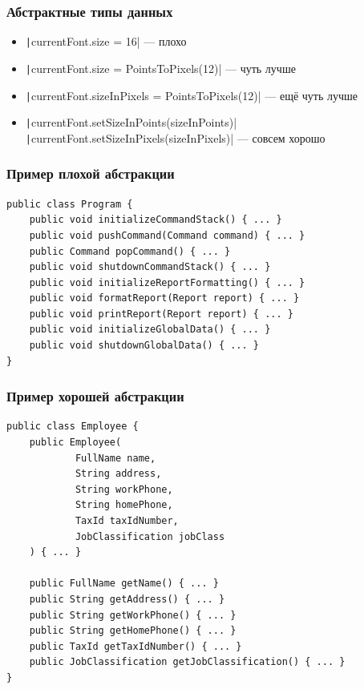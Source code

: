 \documentclass[xetex,mathserif,serif]{beamer}
\begin{document}
    \begin{frame}
        \frametitle{Абстрактные типы данных}
        \begin{itemize}
            \item \texttt|currentFont.size = 16| --- плохо
            \item \texttt|currentFont.size = PointsToPixels(12)| --- чуть лучше
            \item \texttt|currentFont.sizeInPixels = PointsToPixels(12)| --- ещё чуть лучше
            \item \texttt|currentFont.setSizeInPoints(sizeInPoints)| \newline
                    \texttt|currentFont.setSizeInPixels(sizeInPixels)| --- совсем хорошо
        \end{itemize}
    \end{frame}

    \begin{frame}[fragile]
        \frametitle{Пример плохой абстракции}
        \begin{verbatim}
public class Program {
    public void initializeCommandStack() { ... }
    public void pushCommand(Command command) { ... }
    public Command popCommand() { ... }
    public void shutdownCommandStack() { ... }
    public void initializeReportFormatting() { ... }
    public void formatReport(Report report) { ... }
    public void printReport(Report report) { ... }
    public void initializeGlobalData() { ... }
    public void shutdownGlobalData() { ... }
}
        \end{verbatim}
\end{frame}

    \begin{frame}[fragile]
        \frametitle{Пример хорошей абстракции}
        \begin{footnotesize}
            \begin{verbatim}
public class Employee {
    public Employee(
            FullName name,
            String address,
            String workPhone,
            String homePhone,
            TaxId taxIdNumber,
            JobClassification jobClass
    ) { ... }

    public FullName getName() { ... }
    public String getAddress() { ... }
    public String getWorkPhone() { ... }
    public String getHomePhone() { ... }
    public TaxId getTaxIdNumber() { ... }
    public JobClassification getJobClassification() { ... }
}
            \end{verbatim}
        \end{footnotesize}
    \end{frame}
\end{document}
